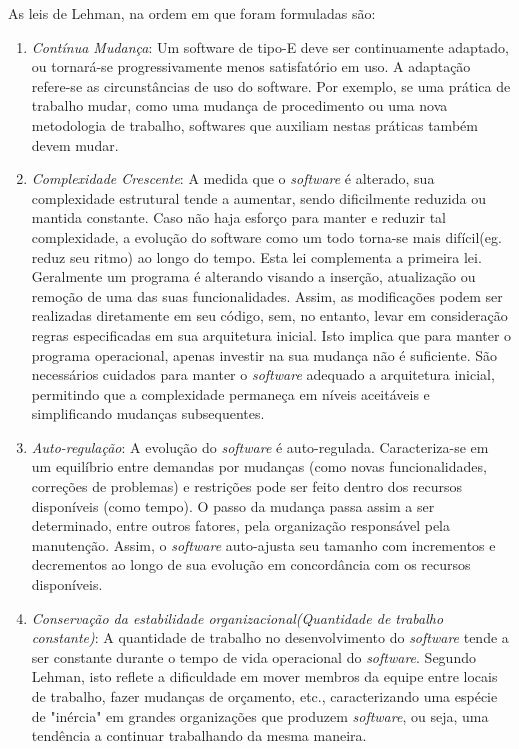 As leis de Lehman, na ordem em que foram formuladas são:
\begin{enumerate}
	\item \textit{Contínua Mudança}: Um software de tipo-E deve ser continuamente adaptado, ou tornará-se progressivamente menos satisfatório em uso. A adaptação refere-se as circunstâncias de uso do software. Por exemplo, se uma prática de trabalho mudar, como uma mudança de procedimento ou uma nova metodologia de trabalho, softwares que auxiliam nestas práticas também devem mudar.
	\item \textit{Complexidade Crescente}: A medida que o \textit{software} é alterado, sua complexidade estrutural tende a aumentar, sendo dificilmente reduzida ou mantida constante. Caso não haja esforço para manter e reduzir tal complexidade, a evolução do software como um todo torna-se mais difícil(eg. reduz seu ritmo) ao longo do tempo. Esta lei complementa a primeira lei. Geralmente um programa é alterando visando a inserção, atualização ou remoção de uma das suas funcionalidades. Assim, as modificações podem ser realizadas diretamente em seu código, sem, no entanto, levar em consideração regras especificadas em sua arquitetura inicial. Isto implica que para manter o programa operacional, apenas investir na sua mudança não é suficiente. São necessários cuidados para manter o \textit{software} adequado a arquitetura inicial, permitindo que a complexidade permaneça em níveis aceitáveis e simplificando mudanças subsequentes.
	\item \textit{Auto-regulação}: A evolução do \textit{software} é auto-regulada. Caracteriza-se em um equilíbrio entre demandas por mudanças (como novas funcionalidades, correções de problemas) e restrições pode ser feito dentro dos recursos disponíveis (como tempo). O passo da mudança passa assim a ser determinado, entre outros fatores, pela organização responsável pela manutenção. Assim, o \textit{software} auto-ajusta seu tamanho com incrementos e decrementos ao longo de sua evolução em concordância com os recursos disponíveis.
	\item \textit{Conservação da estabilidade organizacional(Quantidade de trabalho constante)}: A quantidade de trabalho no desenvolvimento do \textit{software} tende a ser constante durante o tempo de vida operacional do \textit{software}. Segundo Lehman, isto reflete a dificuldade em mover membros da equipe entre locais de trabalho, fazer mudanças de orçamento, etc., caracterizando uma espécie de "inércia" em grandes organizações que produzem \textit{software}, ou seja, uma tendência a continuar trabalhando da mesma maneira. 

\end{enumerate}
